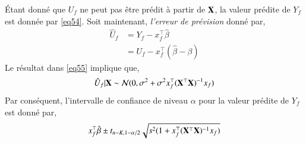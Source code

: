 \documentclass[10pt, reqno]{amsart}
\begin{document}
\'Etant donné que $U_f$ ne peut pas être prédit à partir de $\mathbf X$, la valeur prédite de $Y_f$ est donnée par \eqref{eq54}. Soit maintenant, \emph{l'erreur de prévision} donné par,
\begin{align*}
\hat{U}_f &=Y_f -x_f^\top\hat{\beta}\\
&=U_f - x_f^\top(\hat{\beta}-\beta) 
\end{align*}
Le résultat dans \eqref{eq55} implique que,
\begin{align*}
\hat{U}_f | \mathbf X \sim \mathcal{N}(0, \sigma^2 + \sigma^2x_f^\top(\mathbf X^\top\mathbf X)^{-1}x_f)
\end{align*}
Par conséquent, l'intervalle de confiance de niveau $\alpha$ pour la valeur prédite de $Y_f$ est donné par,
\begin{align*}
x_f^\top\hat{\beta} \pm t_{n-K, 1-\alpha/2}\sqrt{s^2(1+x_f^\top (\mathbf X^\top\mathbf X)^{-1}x_f)}
\end{align*}



 
\end{document}
